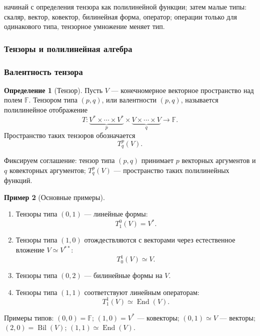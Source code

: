 \documentclass[12pt,a4paper]{article}
\theoremstyle{definition}
\newtheorem{definition}{Определение}[section]
\newtheorem{example}[definition]{Пример}
\theoremstyle{plain}
\theoremstyle{remark}
\newenvironment{planadd}{\begin{planbox}}{\end{planbox}}
\newenvironment{knowledgefix}{\begin{clarifybox}}{\end{clarifybox}}
\newcommand{\F}{\mathbb{F}}
\newcommand{\End}{\operatorname{End}}
\begin{document}
\begin{planadd}

начинай с определения тензора как полилинейной функции; затем малые типы: скаляр, вектор, ковектор, билинейная форма, оператор; операции только для одинакового типа, тензорное умножение меняет тип.

\end{planadd}

\subsubsection{Тензоры и полилинейная алгебра}

\subsubsection*{Валентность тензора}

\begin{definition}[Тензор]
Пусть $V$ --- конечномерное векторное пространство над полем $\F$.
Тензором типа $(p,q)$, или валентности $(p,q)$, называется полилинейное отображение
\[
    T:\underbrace{V^*\times\cdots\times V^*}_{p}
      \times
      \underbrace{V\times\cdots\times V}_{q}
      \longrightarrow \F.
\]
Пространство таких тензоров обозначается
\[
    T^p_q(V).
\]
\begin{knowledgefix}
Фиксируем соглашение: тензор типа \((p,q)\) принимает \(p\) векторных аргументов и \(q\) ковекторных аргументов; \(T^p_q(V)\) — пространство таких полилинейных функций.
\end{knowledgefix}
\end{definition}

\begin{example}[Основные примеры]
\begin{enumerate}[label=\arabic*)]
    \item Тензоры типа $(0,1)$ --- линейные формы:
    \[
        T^0_1(V)=V^*.
    \]
    \item Тензоры типа $(1,0)$ отождествляются с векторами через естественное вложение $V\simeq V^{**}$:
    \[
        T^1_0(V)\simeq V.
    \]
    \item Тензоры типа $(0,2)$ --- билинейные формы на $V$.
    \item Тензоры типа $(1,1)$ соответствуют линейным операторам:
    \[
        T^1_1(V)\simeq \End(V).
    \]
\end{enumerate}
\begin{knowledgefix}
Примеры типов: \((0,0)=\F\); \((1,0)=V^*\) — ковекторы; \((0,1)\simeq V\) — векторы; \((2,0)=\operatorname{Bil}(V)\); \((1,1)\simeq\End(V)\).
\end{knowledgefix}
\end{example}
\end{document}
